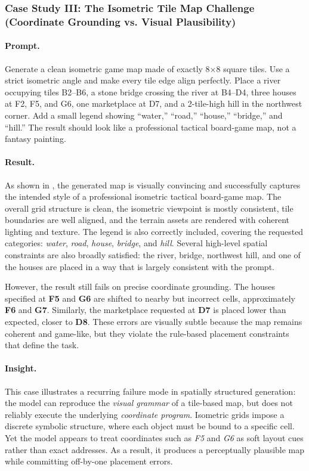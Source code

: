 \subsubsection{Case Study III: The Isometric Tile Map Challenge (Coordinate Grounding vs. Visual Plausibility)}
\label{subsubsec:isometric_tile_map_case}

\paragraph{Prompt.}
Generate a clean isometric game map made of exactly 8$\times$8 square tiles. Use a strict isometric angle and make every tile edge align perfectly. Place a river occupying tiles B2--B6, a stone bridge crossing the river at B4--D4, three houses at F2, F5, and G6, one marketplace at D7, and a 2-tile-high hill in the northwest corner. Add a small legend showing ``water,'' ``road,'' ``house,'' ``bridge,'' and ``hill.'' The result should look like a professional tactical board-game map, not a fantasy painting.

\paragraph{Result.}
As shown in , the generated map is visually convincing and successfully captures the intended style of a professional isometric tactical board-game map. The overall grid structure is clean, the isometric viewpoint is mostly consistent, tile boundaries are well aligned, and the terrain assets are rendered with coherent lighting and texture. The legend is also correctly included, covering the requested categories: \textit{water}, \textit{road}, \textit{house}, \textit{bridge}, and \textit{hill}. Several high-level spatial constraints are also broadly satisfied: the river, bridge, northwest hill, and one of the houses are placed in a way that is largely consistent with the prompt.

However, the result still fails on precise coordinate grounding. The houses specified at \textbf{F5} and \textbf{G6} are shifted to nearby but incorrect cells, approximately \textbf{F6} and \textbf{G7}. Similarly, the marketplace requested at \textbf{D7} is placed lower than expected, closer to \textbf{D8}. These errors are visually subtle because the map remains coherent and game-like, but they violate the rule-based placement constraints that define the task.

\paragraph{Insight.}
This case illustrates a recurring failure mode in spatially structured generation: the model can reproduce the \emph{visual grammar} of a tile-based map, but does not reliably execute the underlying \emph{coordinate program}. Isometric grids impose a discrete symbolic structure, where each object must be bound to a specific cell. Yet the model appears to treat coordinates such as \textit{F5} and \textit{G6} as soft layout cues rather than exact addresses. As a result, it produces a perceptually plausible map while committing off-by-one placement errors.

